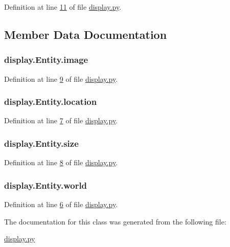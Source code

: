 Definition at line \hyperlink{display_8py_source_l00011}{11} of file \hyperlink{display_8py_source}{display.\+py}.



\subsection{Member Data Documentation}
\hypertarget{classdisplay_1_1Entity_a244569c285ad924e6200d4c1c8b4639c}{
\subsubsection[{image}]{\setlength{\rightskip}{0pt plus 5cm}display.\+Entity.\+image}}\label{classdisplay_1_1Entity_a244569c285ad924e6200d4c1c8b4639c}


Definition at line \hyperlink{display_8py_source_l00009}{9} of file \hyperlink{display_8py_source}{display.\+py}.

\hypertarget{classdisplay_1_1Entity_ae2a1114b0c54ef7eb43c2bd6cd097258}{
\subsubsection[{location}]{\setlength{\rightskip}{0pt plus 5cm}display.\+Entity.\+location}}\label{classdisplay_1_1Entity_ae2a1114b0c54ef7eb43c2bd6cd097258}


Definition at line \hyperlink{display_8py_source_l00007}{7} of file \hyperlink{display_8py_source}{display.\+py}.

\hypertarget{classdisplay_1_1Entity_aa56fd9b8bb6c9510f24ea13be8c6a218}{
\subsubsection[{size}]{\setlength{\rightskip}{0pt plus 5cm}display.\+Entity.\+size}}\label{classdisplay_1_1Entity_aa56fd9b8bb6c9510f24ea13be8c6a218}


Definition at line \hyperlink{display_8py_source_l00008}{8} of file \hyperlink{display_8py_source}{display.\+py}.

\hypertarget{classdisplay_1_1Entity_ad7e3284bfb984c309b35d5a077bd5b21}{
\subsubsection[{world}]{\setlength{\rightskip}{0pt plus 5cm}display.\+Entity.\+world}}\label{classdisplay_1_1Entity_ad7e3284bfb984c309b35d5a077bd5b21}


Definition at line \hyperlink{display_8py_source_l00006}{6} of file \hyperlink{display_8py_source}{display.\+py}.



The documentation for this class was generated from the following file\+:\begin{DoxyCompactItemize}
\item 
\hyperlink{display_8py}{display.\+py}\end{DoxyCompactItemize}
